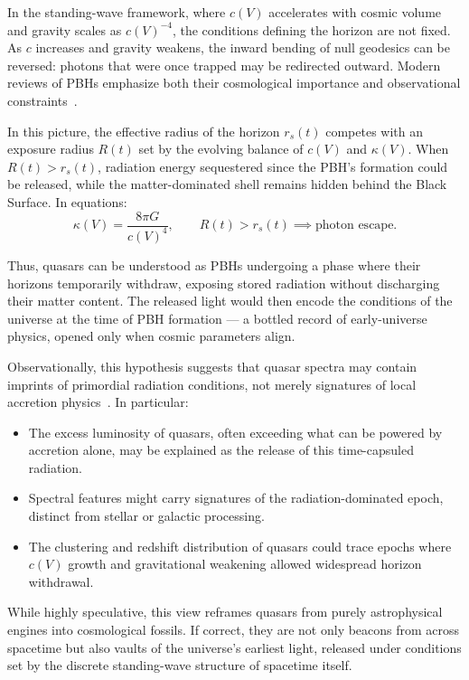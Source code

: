 \documentclass[12pt]{article}
\begin{document}
In the standing-wave framework, where $c(V)$ accelerates with cosmic volume and gravity scales as $c(V)^{-4}$, the conditions defining the horizon are not fixed. As $c$ increases and gravity weakens, the inward bending of null geodesics can be reversed: photons that were once trapped may be redirected outward. Modern reviews of PBHs emphasize both their cosmological importance and observational constraints~\cite{carrkuhnel2020}.

In this picture, the effective radius of the horizon $r_s(t)$ competes with an exposure radius $R(t)$ set by the evolving balance of $c(V)$ and $\kappa(V)$. When $R(t) > r_s(t)$, radiation energy sequestered since the PBH’s formation could be released, while the matter-dominated shell remains hidden behind the Black Surface. In equations:
\[
\kappa(V) = \frac{8\pi G}{c(V)^4}, \qquad R(t) > r_s(t) \implies \text{photon escape}.
\]

Thus, quasars can be understood as PBHs undergoing a phase where their horizons temporarily withdraw, exposing stored radiation without discharging their matter content. The released light would then encode the conditions of the universe at the time of PBH formation — a bottled record of early-universe physics, opened only when cosmic parameters align.

Observationally, this hypothesis suggests that quasar spectra may contain imprints of primordial radiation conditions, not merely signatures of local accretion physics~\cite{ozel2010,king2006}. In particular:
\begin{itemize}
    \item The excess luminosity of quasars, often exceeding what can be powered by accretion alone, may be explained as the release of this time-capsuled radiation.
    \item Spectral features might carry signatures of the radiation-dominated epoch, distinct from stellar or galactic processing.
    \item The clustering and redshift distribution of quasars could trace epochs where $c(V)$ growth and gravitational weakening allowed widespread horizon withdrawal.
\end{itemize}

While highly speculative, this view reframes quasars from purely astrophysical engines into cosmological fossils. If correct, they are not only beacons from across spacetime but also vaults of the universe’s earliest light, released under conditions set by the discrete standing-wave structure of spacetime itself.
\end{document}
